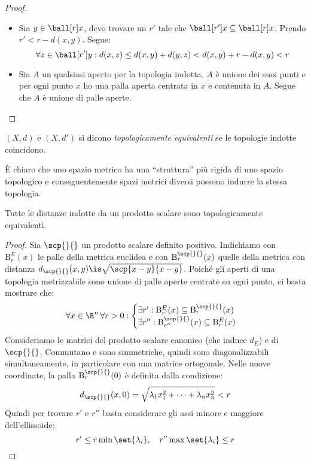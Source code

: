 \begin{proof}~
	\begin{itemize}
		\item
			Sia $y \in \ball[r]x$,
			devo trovare un $r'$ tale che $\ball[r']x \subseteq \ball[r]x$.
			Prendo $r' < r-d(x,y)$.
			Segue:
			\[\forall z \in \ball[r']y: d(x,z) \le d(x,y) + d(y,z) < d(x,y)  + r - d(x,y) < r\]
		\item
			Sia $A$ un qualsiasi aperto per la topologia indotta.
			$A$ è unione dei suoi punti e per ogni punto $x$ ho una palla aperta centrata in $x$ e contenuta in $A$.
			Segue che $A$ è unione di palle aperte.
		\qedhere
	\end{itemize}
\end{proof}

\begin{defn}
	$(X,d)$ e $(X,d')$ si dicono \emph{topologicamente equivalenti} se le topologie indotte coincidono.
\end{defn}

\begin{oss}
	È chiaro che uno spazio metrico ha una ``struttura'' più rigida di uno spazio topologico e conseguentemente spazi metrici diversi possono indurre la stessa topologia.
\end{oss}

\begin{teo}
	Tutte le distanze indotte da un prodotto scalare sono topologicamente equivalenti.
\end{teo}

\begin{proof}
	Sia $\scp{}{}$ un prodotto scalare definito positivo.
	Indichiamo con $\mathrm B^E_r(x)$ le palle della metrica euclidea
	e con $\mathrm B^{\scp{}{}}_r(x)$ quelle della metrica con distanza
	$d_{\scp{}{}}(x,y)\is\sqrt{\scp{x-y}{x-y}}$.
	Poiché gli aperti di una topologia metrizzabile
	sono unione di palle aperte centrate su ogni punto,
	ci basta mostrare che:
	\[\forall x\in\R^n\,\forall r>0:
	\begin{cases}
		\exists r':\mathrm B^E_{r'}(x)\subseteq\mathrm B^{\scp{}{}}_r(x) \\
		\exists r'':\mathrm B^{\scp{}{}}_{r''}(x)\subseteq\mathrm B^E_r(x)
	\end{cases}
	\]
	Consideriamo le matrici del prodotto scalare canonico (che induce $d_E$) e di $\scp{}{}$.
	Commutano e sono simmetriche,
	quindi sono diagonalizzabili simultaneamente,
	in particolare con una matrice ortogonale.
	Nelle nuove coordinate,
	la palla $\mathrm B^{\scp{}{}}_r(0)$ è definita dalla condizione:
	\[d_{\scp{}{}}(x,0)=\sqrt{\lambda_1x_1^2+\dots+\lambda_nx_n^2}<r\]
	Quindi per trovare $r'$ e $r''$
	basta considerare gli assi minore e maggiore dell'ellissoide:
	\[r'\le r\min\set{\lambda_i},\quad r''\max\set{\lambda_i}\le r \qedhere\]
\end{proof}

